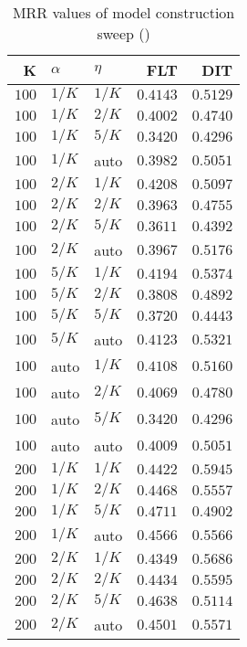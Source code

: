 
\begin{table}
\begin{spacing}{1.2}
\centering
\caption{MRR values of \bookkeeper model construction sweep (\cone)}
\label{table:bookkeeper_model_sweep}
\vspace{0.2em}
\parbox{.45\linewidth}{\centering \begin{tabular}{rll|rr}
\toprule
    K &  $\alpha$ &    $\eta$ &      FLT &      DIT \\
\midrule
$100$ &  $1/K$ &  $1/K$ & $0.4143$ & $0.5129$ \\
$100$ &  $1/K$ &  $2/K$ & $0.4002$ & $0.4740$ \\
$100$ &  $1/K$ &  $5/K$ & $0.3420$ & $0.4296$ \\
$100$ &  $1/K$ &   auto & $0.3982$ & $0.5051$ \\
$100$ &  $2/K$ &  $1/K$ & $0.4208$ & $0.5097$ \\
$100$ &  $2/K$ &  $2/K$ & $0.3963$ & $0.4755$ \\
$100$ &  $2/K$ &  $5/K$ & $0.3611$ & $0.4392$ \\
$100$ &  $2/K$ &   auto & $0.3967$ & $0.5176$ \\
$100$ &  $5/K$ &  $1/K$ & $0.4194$ & $0.5374$ \\
$100$ &  $5/K$ &  $2/K$ & $0.3808$ & $0.4892$ \\
$100$ &  $5/K$ &  $5/K$ & $0.3720$ & $0.4443$ \\
$100$ &  $5/K$ &   auto & $0.4123$ & $0.5321$ \\
$100$ &   auto &  $1/K$ & $0.4108$ & $0.5160$ \\
$100$ &   auto &  $2/K$ & $0.4069$ & $0.4780$ \\
$100$ &   auto &  $5/K$ & $0.3420$ & $0.4296$ \\
$100$ &   auto &   auto & $0.4009$ & $0.5051$ \\
$200$ &  $1/K$ &  $1/K$ & $0.4422$ & $0.5945$ \\
$200$ &  $1/K$ &  $2/K$ & $0.4468$ & $0.5557$ \\
$200$ &  $1/K$ &  $5/K$ & $0.4711$ & $0.4902$ \\
$200$ &  $1/K$ &   auto & $0.4566$ & $0.5566$ \\
$200$ &  $2/K$ &  $1/K$ & $0.4349$ & $0.5686$ \\
$200$ &  $2/K$ &  $2/K$ & $0.4434$ & $0.5595$ \\
$200$ &  $2/K$ &  $5/K$ & $0.4638$ & $0.5114$ \\
$200$ &  $2/K$ &   auto & $0.4501$ & $0.5571$ \\

\end{tabular}}
\end{spacing}
\end{table}
